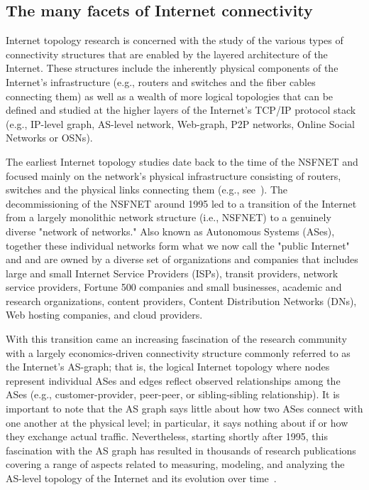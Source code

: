 \documentclass{sig-alternate-10pt}
\begin{document}
\subsection{The many facets of Internet connectivity}

Internet topology research is concerned with the study of the various types of connectivity structures that are enabled by the layered architecture of the Internet.  These structures include the inherently physical components of the Internet's infrastructure (e.g., routers and switches and the fiber cables 
connecting them) as well as a wealth of more logical topologies that can be defined and studied at the higher layers of the Internet's TCP/IP protocol stack (e.g., IP-level graph, AS-level network, Web-graph, P2P networks, Online Social Networks or OSNs).  

The earliest Internet topology studies date back to the time of the NSFNET and focused mainly on the network's physical infrastructure consisting of routers, switches and the physical links connecting them (e.g., 
see~\cite{calvert_etal1997,pansiot_grad1998}). The decommissioning of the NSFNET around 1995 led to a transition of the Internet from a largely monolithic network structure (i.e., NSFNET) to a genuinely diverse "network of networks."  Also known as Autonomous Systems (ASes), together these individual networks form what we now call the "public Internet" and and are owned by a diverse set of organizations and companies that includes large and small Internet Service Providers (ISPs), transit providers, network service providers, Fortune 500 companies and small businesses, academic and research organizations, content providers, Content Distribution Networks (DNs), Web hosting companies, and cloud providers. 

With this transition came an increasing fascination of the research community with a largely economics-driven connectivity structure commonly referred to as the Internet's AS-graph; that 
is, the logical Internet topology where nodes represent individual ASes and edges reflect observed relationships among the ASes (e.g., customer-provider, peer-peer, or sibling-sibling 
relationship). It is important to note that the AS graph says little about how two ASes connect with one another at the physical level; in particular, it says nothing about if or how they exchange actual traffic.  Nevertheless, starting shortly after 1995, this fascination with the AS graph has resulted in thousands of research publications covering a range of aspects 
related to measuring, modeling, and analyzing the AS-level topology of the Internet and its evolution over time~\cite{govindan_reddy1997,roughan_etal2011}.
\end{document}
